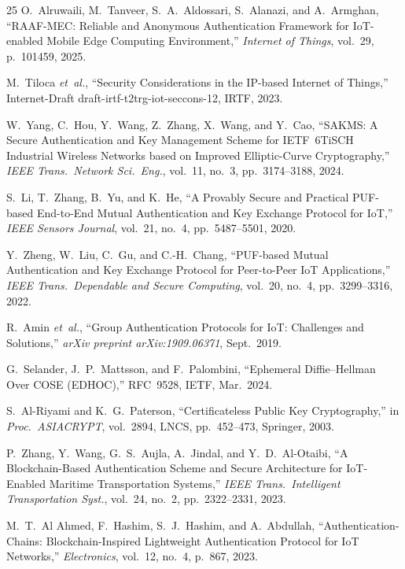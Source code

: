 \documentclass[conference]{IEEEtran}
\begin{document}
\begin{thebibliography}{25}
O.~Alruwaili, M.~Tanveer, S.~A.~Aldossari, S.~Alanazi, and A.~Armghan,
``RAAF-MEC: Reliable and Anonymous Authentication Framework for IoT-enabled
Mobile Edge Computing Environment,''
\emph{Internet of Things}, vol.~29, p.~101459, 2025.

M.~Tiloca \emph{et~al.},
``Security Considerations in the IP-based Internet of Things,''
Internet-Draft draft-irtf-t2trg-iot-seccons-12, IRTF, 2023.

W.~Yang, C.~Hou, Y.~Wang, Z.~Zhang, X.~Wang, and Y.~Cao,
``SAKMS: A Secure Authentication and Key Management Scheme for IETF~6TiSCH
Industrial Wireless Networks based on Improved Elliptic-Curve Cryptography,''
\emph{IEEE Trans.\ Network Sci.\ Eng.}, vol.~11, no.~3, pp.~3174--3188, 2024.

S.~Li, T.~Zhang, B.~Yu, and K.~He,
``A Provably Secure and Practical PUF-based End-to-End Mutual Authentication
and Key Exchange Protocol for IoT,''
\emph{IEEE Sensors Journal}, vol.~21, no.~4, pp.~5487--5501, 2020.

Y.~Zheng, W.~Liu, C.~Gu, and C.-H.~Chang,
``PUF-based Mutual Authentication and Key Exchange Protocol for Peer-to-Peer
IoT Applications,''
\emph{IEEE Trans.\ Dependable and Secure Computing}, vol.~20, no.~4,
pp.~3299--3316, 2022.

R.~Amin \emph{et~al.},
``Group Authentication Protocols for IoT: Challenges and Solutions,''
\emph{arXiv preprint arXiv:1909.06371}, Sept.~2019.

G.~Selander, J.~P.~Mattsson, and F.~Palombini,
``Ephemeral Diffie--Hellman Over COSE (EDHOC),''
RFC~9528, IETF, Mar.~2024.

S.~Al-Riyami and K.~G.~Paterson,
``Certificateless Public Key Cryptography,''
in \emph{Proc.\ ASIACRYPT}, vol.~2894, LNCS, pp.~452--473, Springer, 2003.

P.~Zhang, Y.~Wang, G.~S.~Aujla, A.~Jindal, and Y.~D.~Al-Otaibi,
``A Blockchain-Based Authentication Scheme and Secure Architecture for
IoT-Enabled Maritime Transportation Systems,''
\emph{IEEE Trans.\ Intelligent Transportation Syst.}, vol.~24, no.~2,
pp.~2322--2331, 2023.

M.~T.~Al Ahmed, F.~Hashim, S.~J.~Hashim, and A.~Abdullah,
``Authentication-Chains: Blockchain-Inspired Lightweight Authentication
Protocol for IoT Networks,''
\emph{Electronics}, vol.~12, no.~4, p.~867, 2023.


\end{thebibliography}
\end{document}
